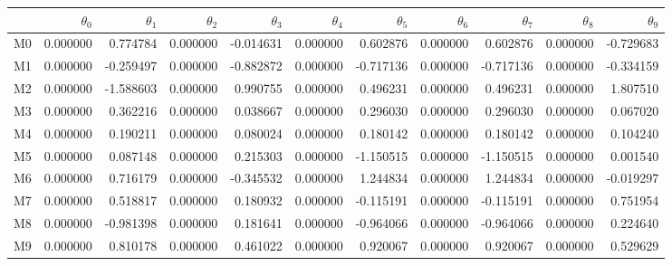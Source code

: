 \begin{tabular}{lrrrrrrrrrr}
\toprule
 & $\theta_{0}$ & $\theta_{1}$ & $\theta_{2}$ & $\theta_{3}$ & $\theta_{4}$ & $\theta_{5}$ & $\theta_{6}$ & $\theta_{7}$ & $\theta_{8}$ & $\theta_{9}$ \\
\midrule
M0 & 0.000000 & 0.774784 & 0.000000 & -0.014631 & 0.000000 & 0.602876 & 0.000000 & 0.602876 & 0.000000 & -0.729683 \\
M1 & 0.000000 & -0.259497 & 0.000000 & -0.882872 & 0.000000 & -0.717136 & 0.000000 & -0.717136 & 0.000000 & -0.334159 \\
M2 & 0.000000 & -1.588603 & 0.000000 & 0.990755 & 0.000000 & 0.496231 & 0.000000 & 0.496231 & 0.000000 & 1.807510 \\
M3 & 0.000000 & 0.362216 & 0.000000 & 0.038667 & 0.000000 & 0.296030 & 0.000000 & 0.296030 & 0.000000 & 0.067020 \\
M4 & 0.000000 & 0.190211 & 0.000000 & 0.080024 & 0.000000 & 0.180142 & 0.000000 & 0.180142 & 0.000000 & 0.104240 \\
M5 & 0.000000 & 0.087148 & 0.000000 & 0.215303 & 0.000000 & -1.150515 & 0.000000 & -1.150515 & 0.000000 & 0.001540 \\
M6 & 0.000000 & 0.716179 & 0.000000 & -0.345532 & 0.000000 & 1.244834 & 0.000000 & 1.244834 & 0.000000 & -0.019297 \\
M7 & 0.000000 & 0.518817 & 0.000000 & 0.180932 & 0.000000 & -0.115191 & 0.000000 & -0.115191 & 0.000000 & 0.751954 \\
M8 & 0.000000 & -0.981398 & 0.000000 & 0.181641 & 0.000000 & -0.964066 & 0.000000 & -0.964066 & 0.000000 & 0.224640 \\
M9 & 0.000000 & 0.810178 & 0.000000 & 0.461022 & 0.000000 & 0.920067 & 0.000000 & 0.920067 & 0.000000 & 0.529629 \\
\bottomrule
\end{tabular}
